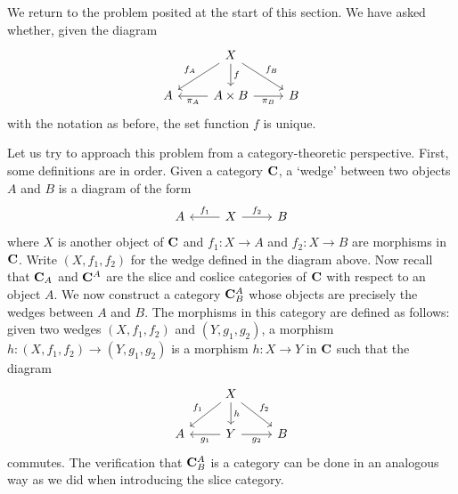 \begin{example}
    We return to the problem posited at the start of this section. We have asked
    whether, given the diagram
    \[
    \begin{tikzcd}
        & X \arrow[ld, "f_A"'] \arrow[rd, "f_B"] \arrow[d, "f"] &   \\
      A & A \times B \arrow[r, "\pi_B"'] \arrow[l, "\pi_A"]     & B
      \end{tikzcd} 
    \]
    with the notation as before, the set function \(f\) is unique.

    Let us try to approach this problem from a category-theoretic perspective.
    First, some definitions are in order. Given a category \(\mathbf{C}\), a
    `wedge' between two objects \(A\) and \(B\) is a diagram of the form
    \[
        \begin{tikzcd}
            A & X \arrow[r, "f_2"] \arrow[l, "f_1"'] & B
            \end{tikzcd}
    \]
    where \(X\) is another object of \(\mathbf{C}\) and \(f_1: X \to A\) and
    \(f_2: X \to B\) are morphisms in \(\mathbf{C}\). Write \((X, f_1, f_2)\) for
    the wedge defined in the diagram above. Now recall that \(\mathbf{C}_A\) and
    \(\mathbf{C}^A\) are the slice and coslice categories of \(\mathbf{C}\) with
    respect to an object \(A\). We now construct a category \(\mathbf{C}^A_B\)
    whose objects are precisely the wedges between \(A\) and \(B\). The
    morphisms in this category are defined as follows: given two wedges \((X,
    f_1, f_2)\) and \((Y, g_1, g_2)\), a morphism \(h: (X, f_1, f_2) \to (Y,
    g_1, g_2)\) is a morphism \(h: X \to Y\) in \(\mathbf{C}\) such that the
    diagram
    \[
        \begin{tikzcd}
            & X \arrow[ld, "f_1"'] \arrow[rd, "f_2"] \arrow[d, "h"] &   \\
          A & Y \arrow[r, "g_2"'] \arrow[l, "g_1"]     & B
          \end{tikzcd}
    \]
    commutes. The verification that \(\mathbf{C}^A_B\) is a category can be done
    in an analogous way as we did when introducing the slice category.


\end{example}
